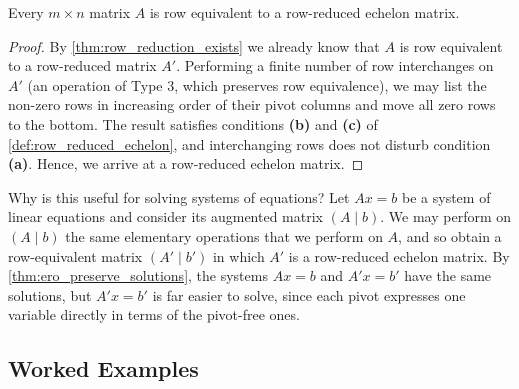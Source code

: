 \begin{theorem}
\label{thm:echelon_form_exists}
Every $m \times n$ matrix $A$ is row equivalent to a row-reduced echelon matrix.
\end{theorem}

\begin{proof}
By \cref{thm:row_reduction_exists} we already know that $A$ is row equivalent to a row-reduced matrix $A'$. Performing a finite number of row interchanges on $A'$ (an operation of Type 3, which preserves row equivalence), we may list the non-zero rows in increasing order of their pivot columns and move all zero rows to the bottom. The result satisfies conditions \textbf{(b)} and \textbf{(c)} of \cref{def:row_reduced_echelon}, and interchanging rows does not disturb condition \textbf{(a)}. Hence, we arrive at a row-reduced echelon matrix.
\end{proof}

\begin{remark}
\label{rem:why_echelon_helps}
Why is this useful for solving systems of equations? Let $A x = b$ be a system of linear equations and consider its augmented matrix $(A \mid b)$. We may perform on $(A \mid b)$ the same elementary operations that we perform on $A$, and so obtain a row-equivalent matrix $(A' \mid b')$ in which $A'$ is a row-reduced echelon matrix. By \cref{thm:ero_preserve_solutions}, the systems $A x = b$ and $A' x = b'$ have the same solutions, but $A' x = b'$ is far easier to solve, since each pivot expresses one variable directly in terms of the pivot-free ones.
\end{remark}

\subsection{Worked Examples}

